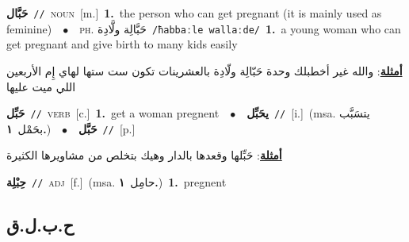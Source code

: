 \documentclass[10pt,a4paper,twoside]{article} %
\begin{document}
\begin{multicols}{2}
{{{{{{{\setlength\topsep{0pt}\textbf{\foreignlanguage{arabic}{حَبَّال}}\ {\color{gray}\texttt{//}\color{black}}\ \textsc{noun}\ [m.]\ \textbf{1.}~the person who can get pregnant (it is mainly used as feminine)\ \ $\bullet$\ \ \textsc{ph.} \color{gray} \foreignlanguage{arabic}{حَبَّالِة ولَّادِة}\color{black}\ {\color{gray}\texttt{/{\sffamily ħabbaːle wallaːde}/}\color{black}}\ \textbf{1.}~a young woman who can get pregnant and give birth to many kids easily\  \begin{flushright}\color{gray}\foreignlanguage{arabic}{\textbf{\underline{\foreignlanguage{arabic}{أمثلة}}}: والله غير أخطبلك وحدة حَبّالِة ولّادِة  بالعشرينات تكون ست ستها لهاي إِم الأربعين اللي ميت عليها}\end{flushright}\color{black}} \vspace{2mm}

{\setlength\topsep{0pt}\textbf{\foreignlanguage{arabic}{حَبِّل}}\ {\color{gray}\texttt{//}\color{black}}\ \textsc{verb}\ [c.]\ \textbf{1.}~get a woman pregnent\ \ $\bullet$\ \ \setlength\topsep{0pt}\textbf{\foreignlanguage{arabic}{يحَبِّل}}\ {\color{gray}\texttt{//}\color{black}}\ [i.]\ \color{gray}(msa. \foreignlanguage{arabic}{يتسَبَّب بحَمْل}~\foreignlanguage{arabic}{\textbf{١.}})\color{black}\ \ $\bullet$\ \ \setlength\topsep{0pt}\textbf{\foreignlanguage{arabic}{حَبَّل}}\ {\color{gray}\texttt{//}\color{black}}\ [p.]\  \begin{flushright}\color{gray}\foreignlanguage{arabic}{\textbf{\underline{\foreignlanguage{arabic}{أمثلة}}}: حَبِّلها وقعدها بالدار وهيك بتخلص من مشاويرها الكثيرة}\end{flushright}\color{black}} \vspace{2mm}

{\setlength\topsep{0pt}\textbf{\foreignlanguage{arabic}{حِبْلِة}}\ {\color{gray}\texttt{//}\color{black}}\ \textsc{adj}\ [f.]\ \color{gray}(msa. \foreignlanguage{arabic}{حامِل}~\foreignlanguage{arabic}{\textbf{١.}})\color{black}\ \textbf{1.}~pregnent\ 

\vspace{-3mm}
\subsection*{\color{blue}\foreignlanguage{arabic}{ح.ب.ل.ق}\color{blue}{ (ntws)}} 

}}}}}}}
\end{multicols}
\end{document}

